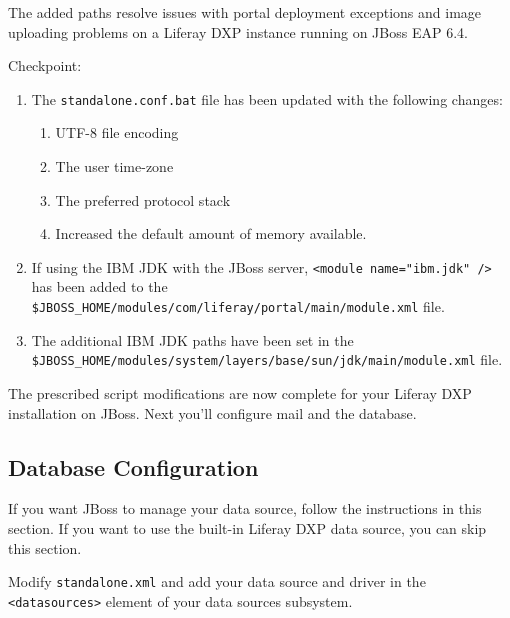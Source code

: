 The added paths resolve issues with portal deployment exceptions and
image uploading problems on a Liferay DXP instance running on JBoss EAP
6.4.

\noindent\hrulefill

Checkpoint:

\begin{enumerate}
\def\labelenumi{\arabic{enumi}.}
\item
  The \texttt{standalone.conf.bat} file has been updated with the
  following changes:

  \begin{enumerate}
  \def\labelenumii{\alph{enumii}.}
  \tightlist
  \item
    UTF-8 file encoding
  \item
    The user time-zone
  \item
    The preferred protocol stack
  \item
    Increased the default amount of memory available.
  \end{enumerate}
\item
  If using the IBM JDK with the JBoss server,
  \texttt{\textless{}module\ name="ibm.jdk"\ /\textgreater{}} has been
  added to the
  \texttt{\$JBOSS\_HOME/modules/com/liferay/portal/main/module.xml}
  file.
\item
  The additional IBM JDK paths have been set in the
  \texttt{\$JBOSS\_HOME/modules/system/layers/base/sun/jdk/main/module.xml}
  file.
\end{enumerate}

The prescribed script modifications are now complete for your Liferay
DXP installation on JBoss. Next you'll configure mail and the database.

\subsection{Database Configuration}\label{database-configuration-1}

If you want JBoss to manage your data source, follow the instructions in
this section. If you want to use the built-in Liferay DXP data source,
you can skip this section.

Modify \texttt{standalone.xml} and add your data source and driver in
the \texttt{\textless{}datasources\textgreater{}} element of your data
sources subsystem.

